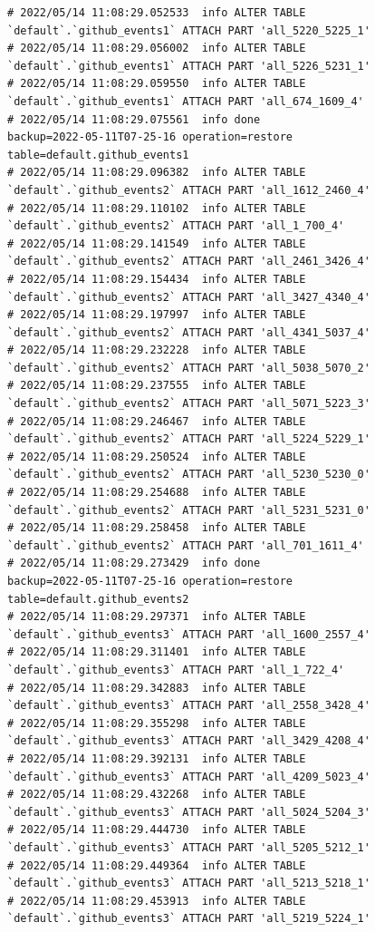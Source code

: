 \begin{verbatim}
# 2022/05/14 11:08:29.052533  info ALTER TABLE `default`.`github_events1` ATTACH PART 'all_5220_5225_1'
# 2022/05/14 11:08:29.056002  info ALTER TABLE `default`.`github_events1` ATTACH PART 'all_5226_5231_1'
# 2022/05/14 11:08:29.059550  info ALTER TABLE `default`.`github_events1` ATTACH PART 'all_674_1609_4'
# 2022/05/14 11:08:29.075561  info done                      backup=2022-05-11T07-25-16 operation=restore table=default.github_events1
# 2022/05/14 11:08:29.096382  info ALTER TABLE `default`.`github_events2` ATTACH PART 'all_1612_2460_4'
# 2022/05/14 11:08:29.110102  info ALTER TABLE `default`.`github_events2` ATTACH PART 'all_1_700_4'
# 2022/05/14 11:08:29.141549  info ALTER TABLE `default`.`github_events2` ATTACH PART 'all_2461_3426_4'
# 2022/05/14 11:08:29.154434  info ALTER TABLE `default`.`github_events2` ATTACH PART 'all_3427_4340_4'
# 2022/05/14 11:08:29.197997  info ALTER TABLE `default`.`github_events2` ATTACH PART 'all_4341_5037_4'
# 2022/05/14 11:08:29.232228  info ALTER TABLE `default`.`github_events2` ATTACH PART 'all_5038_5070_2'
# 2022/05/14 11:08:29.237555  info ALTER TABLE `default`.`github_events2` ATTACH PART 'all_5071_5223_3'
# 2022/05/14 11:08:29.246467  info ALTER TABLE `default`.`github_events2` ATTACH PART 'all_5224_5229_1'
# 2022/05/14 11:08:29.250524  info ALTER TABLE `default`.`github_events2` ATTACH PART 'all_5230_5230_0'
# 2022/05/14 11:08:29.254688  info ALTER TABLE `default`.`github_events2` ATTACH PART 'all_5231_5231_0'
# 2022/05/14 11:08:29.258458  info ALTER TABLE `default`.`github_events2` ATTACH PART 'all_701_1611_4'
# 2022/05/14 11:08:29.273429  info done                      backup=2022-05-11T07-25-16 operation=restore table=default.github_events2
# 2022/05/14 11:08:29.297371  info ALTER TABLE `default`.`github_events3` ATTACH PART 'all_1600_2557_4'
# 2022/05/14 11:08:29.311401  info ALTER TABLE `default`.`github_events3` ATTACH PART 'all_1_722_4'
# 2022/05/14 11:08:29.342883  info ALTER TABLE `default`.`github_events3` ATTACH PART 'all_2558_3428_4'
# 2022/05/14 11:08:29.355298  info ALTER TABLE `default`.`github_events3` ATTACH PART 'all_3429_4208_4'
# 2022/05/14 11:08:29.392131  info ALTER TABLE `default`.`github_events3` ATTACH PART 'all_4209_5023_4'
# 2022/05/14 11:08:29.432268  info ALTER TABLE `default`.`github_events3` ATTACH PART 'all_5024_5204_3'
# 2022/05/14 11:08:29.444730  info ALTER TABLE `default`.`github_events3` ATTACH PART 'all_5205_5212_1'
# 2022/05/14 11:08:29.449364  info ALTER TABLE `default`.`github_events3` ATTACH PART 'all_5213_5218_1'
# 2022/05/14 11:08:29.453913  info ALTER TABLE `default`.`github_events3` ATTACH PART 'all_5219_5224_1'

\end{verbatim}
